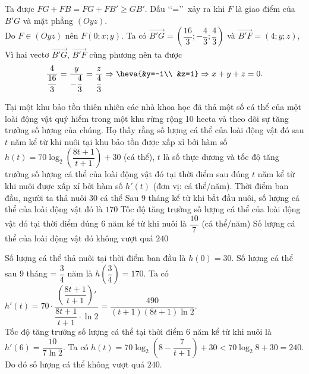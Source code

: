 \begin{ex}
{\begin{itemchoice}
		Ta được $FG+FB= FG+FB' \ge GB'$. Dấu \lq\lq =\rq\rq\ xảy ra khi $F$ là giao điểm của $B'G$ và mặt phẳng $(Oyz)$.\\
		Do $F \in (Oyz)$ nên $F(0;x;y)$. Ta có $\overrightarrow{B'G}= \left( \dfrac{16}{3}; -\dfrac{4}{3}; \dfrac{4}{3}\right)$ và $\overrightarrow{B'F}= (4;y;z)$,\\
		Vì hai vectơ $\overrightarrow{B'G}$, $\overrightarrow{B'F}$ cùng phương nên ta được
		\[
		\dfrac{4}{\dfrac{16}{3}}= \dfrac{y}{-\dfrac{4}{3}} = \dfrac{z}{\dfrac{4}{3}} \Rightarrow \heva{&y=-1\\ &z=1} \Rightarrow x+y+z=0.
		\]
	\end{itemchoice}
	}
\end{ex}

\begin{ex}%
	Tại một khu bảo tồn thiên nhiên các nhà khoa học đã thả một số cá thể của một loài động vật quý hiếm trong một khu rừng rộng 10 hecta và theo dõi sự tăng trưởng số lượng của chúng. Họ thấy rằng số lượng cá thể của loài động vật đó sau $t$ năm kể từ khi nuôi tại khu bảo tồn được xấp xỉ bởi hàm số $h(t)=70\log_2\left(\dfrac{8t+1}{t+1}\right)+30$ (cá thể), $t$ là số thực dương và tốc độ tăng trưởng số lượng cá thể của loài động vật đó tại thời điểm sau đúng $t$ năm kể từ khi nuôi được xấp xỉ bởi hàm số $h'(t)$ (đơn vị: cá thể/năm).
	\choiceTF
	{\True Thời điểm ban đầu, người ta thả nuôi $30$ cá thể}
	{\True Sau 9 tháng kể từ khi bắt đầu nuôi, số lượng cá thể của loài động vật đó là $170$}
	{Tốc độ tăng trưởng số lượng cá thể của loài động vật đó tại thời điểm đúng $6$ năm kể từ khi nuôi là $\dfrac{10}{7}$ (cá thể/năm)}
	{\True Số lượng cá thể của loài động vật đó không vượt quá $240$}
	\loigiai
	{
		\begin{itemchoice}
			\itemch Số lượng cá thể thả nuôi tại thời điểm ban đầu là $h(0)=30$.
			\itemch Số lượng cá thể sau 9 tháng = $\dfrac{3}{4}$ năm là  $h\left( \dfrac{3}{4}\right)= 170$.
			\itemch Ta có $h'(t)= 70 \cdot \dfrac{\left( \dfrac{8t+1}{t+1}\right)'}{\dfrac{8t+1}{t+1} \cdot \ln 2}= \dfrac{490}{(t+1)(8t+1)\ln 2}$.\\
			Tốc độ tăng trưởng số lượng cá thể tại thời điểm $6$ năm kể từ khi nuôi là $h'(6)= \dfrac{10}{7 \ln 2}$.
			\itemch Ta có $h(t)=70 \log_2 \left( 8-\dfrac{7}{t+1}\right) + 30 < 70 \log_2 8 + 30 = 240$.\\
			Do đó số lượng cá thể không vượt quá $240$.
		\end{itemchoice}
	}
\end{ex}

